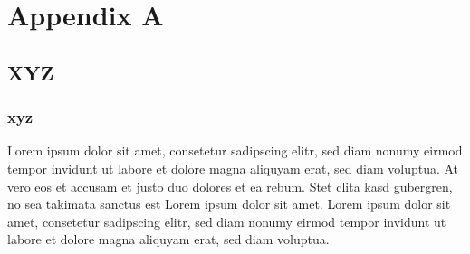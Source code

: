 \chapter{Appendix A}\label{cha:appendix_A}


\section{XYZ} \label{sec:XYZ}


\subsection{xyz} \label{ssec:xyz}
Lorem ipsum dolor sit amet, consetetur sadipscing elitr, sed diam nonumy eirmod tempor invidunt ut labore et dolore magna aliquyam erat, sed diam voluptua. At vero eos et accusam et justo duo dolores et ea rebum. Stet clita kasd gubergren, no sea takimata sanctus est Lorem ipsum dolor sit amet. Lorem ipsum dolor sit amet, consetetur sadipscing elitr, sed diam nonumy eirmod tempor invidunt ut labore et dolore magna aliquyam erat, sed diam voluptua.
